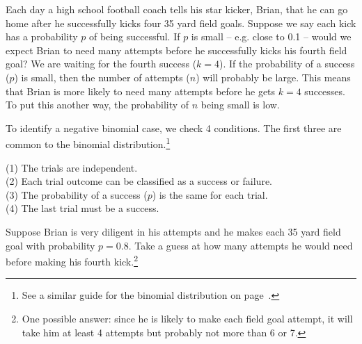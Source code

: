\begin{example}{Each day a high school football coach tells his star kicker, Brian, that he can go home after he successfully kicks four 35 yard field goals. Suppose we say each kick has a probability $p$ of being successful. If $p$ is small -- e.g. close to 0.1 -- would we expect Brian to need many attempts before he successfully kicks his fourth field goal?}
We are waiting for the fourth success ($k=4$). If the probability of a success ($p$) is small, then the number of attempts ($n$) will probably be large. This means that Brian is more likely to need many attempts before he gets $k=4$ successes. To put this another way, the probability of $n$ being small is low.
\end{example}

To identify a negative binomial case, we check 4 conditions. The first three are common to the binomial distribution.\footnote{See a similar guide for the binomial distribution on page~\pageref{isItBinomialTipBox}.}

\begin{tipBox}{
(1) The trials are independent. \\
(2) Each trial outcome can be classified as a success or failure. \\
(3) The probability of a success ($p$) is the same for each trial. \\
(4) The last trial must be a success.}
\end{tipBox}

\begin{exercise}
Suppose Brian is very diligent in his attempts and he makes each 35 yard field goal with probability $p=0.8$. Take a guess at how many attempts he would need before making his fourth kick.\footnote{One possible answer: since he is likely to make each field goal attempt, it will take him at least 4 attempts but probably not more than 6 or 7.}
\end{exercise}

